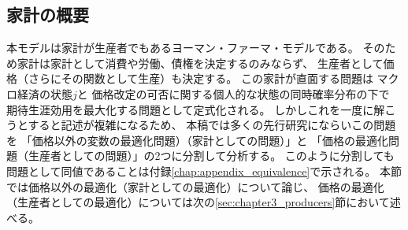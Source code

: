 
\subsection{家計の概要}
\label{sec:chapter3_households_overview}
本モデルは家計が生産者でもあるヨーマン・ファーマ・モデルである。
そのため家計は家計として消費や労働、債権を決定するのみならず、
生産者として価格（さらにその関数として生産）も決定する。
この家計が直面する問題は
マクロ経済の状態\(j\)と
価格改定の可否に関する個人的な状態の同時確率分布の下で
期待生涯効用を最大化する問題として定式化される。
しかしこれを一度に解こうとすると記述が複雑になるため、
本稿では多くの先行研究にならいこの問題を
「価格以外の変数の最適化問題）（家計としての問題）」と
「価格の最適化問題（生産者としての問題）」の2つに分割して分析する。
このように分割しても問題として同値であることは付録\ref{chap:appendix_equivalence}で示される。
本節では価格以外の最適化（家計としての最適化）について論じ、
価格の最適化（生産者としての最適化）については次の\ref{sec:chapter3_producers}節において述べる。